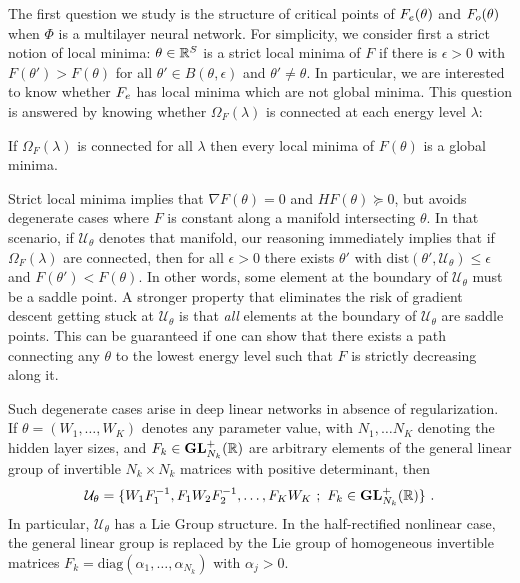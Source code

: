 The first question we study is the structure of critical points of $F_{e}(\theta)$ and $F_{o}(\theta)$
when $\Phi$ is a multilayer neural network. 
For simplicity, we consider first a strict notion of local minima: 
$\theta \in {\mathbb{R}}^S $ is a strict local minima of $F$ if there is $\epsilon>0$ with $F(\theta') > F(\theta)$ for all $\theta' \in B(\theta,\epsilon)$ and $\theta'\neq \theta$.
In particular, we are interested to know whether
$F_{e}$ has local minima which are not global minima. 
This question is answered by 
knowing whether $\Omega_F(\lambda)$ is connected at each energy level $\lambda$:

\begin{proposition}
\label{connectedminima}
If $\Omega_F(\lambda)$ is connected for all $\lambda$ then every local minima of $F(\theta)$ is a global minima. 
\end{proposition}

Strict local minima implies that $\nabla F(\theta) =0$ and $H F(\theta) \succeq 0$, but avoids degenerate cases where $F$ is constant along a manifold intersecting $\theta$. In that scenario, if $\mathcal{U}_\theta$ denotes that manifold, our reasoning immediately 
implies that if $\Omega_F(\lambda)$ are connected, then for all $\epsilon > 0$ there exists $\theta'$ with $\text{dist}(\theta',\mathcal{U}_\theta) \leq \epsilon$ and $F(\theta') < F(\theta)$. In other words, some element at the boundary of $\mathcal{U}_\theta$ must be a saddle point. 
A stronger property that eliminates the risk of gradient descent getting stuck at $\mathcal{U}_\theta$ is 
  that \emph{all} elements at the boundary of $\mathcal{U}_\theta$ are saddle points. This can be guaranteed if one can show that 
  there exists a path connecting any $\theta$ to the lowest energy level such that $F$ is strictly decreasing along it. 

Such degenerate cases arise in deep linear networks in absence of regularization. If $\theta = (W_1, \dots, W_K)$ denotes any parameter value, with $N_1, \dots N_K$ denoting the hidden layer sizes, and $F_k \in \mathbf{GL}_{N_k}^{+}({\mathbb{R}})$ are arbitrary elements of the general linear group of invertible $N_k \times N_k$ matrices with positive determinant, then   
$$\mathcal{U}_\theta = \{ W_1 F_1^{-1}, F_1 W_2 F_2^{-1}, \dots, F_K W_K  ~;~ F_k \in \mathbf{GL}_{N_k}^{+}({\mathbb{R}}) \}~. $$
In particular, $\mathcal{U}_\theta$ has a Lie Group structure. In the half-rectified nonlinear case, the general linear group is replaced by the Lie group of homogeneous invertible matrices $F_k = \text{diag}(\alpha_1, \dots, \alpha_{N_k})$ with $\alpha_j > 0$. 

